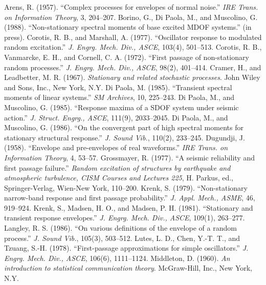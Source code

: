 \documentclass[12pt]{article}
\begin{document}
\begin{thebibliography}{99}
 Arens, R. (1957). ``Complex processes for envelopes of normal noise.'' \emph{IRE Trans. on Information Theory}, 3, 204--207.
 Borino, G., Di Paola, M., and Muscolino, G. (1988). ``Non-stationary spectral moments of base excited MDOF systems.'' (in press).
 Corotis, R. B., and Marshall, A. (1977). ``Oscillator response to modulated random excitation.'' \emph{J. Engrg. Mech. Div., ASCE}, 103(4), 501--513.
 Corotis, R. B., Vanmarcke, E. H., and Cornell, C. A. (1972). ``First passage of non-stationary random processes.'' \emph{J. Engrg. Mech. Div., ASCE}, 98(2), 401--414.
 Cramer, H., and Leadbetter, M. R. (1967). \emph{Stationary and related stochastic processes}. John Wiley and Sons, Inc., New York, N.Y.
 Di Paola, M. (1985). ``Transient spectral moments of linear systems.'' \emph{SM Archives}, 10, 225--243.
 Di Paola, M., and Muscolino, G. (1985). ``Response maxima of a SDOF system under seismic action.'' \emph{J. Struct. Engrg., ASCE}, 111(9), 2033--2045.
 Di Paola, M., and Muscolino, G. (1986). ``On the convergent part of high spectral moments for stationary structural response.'' \emph{J. Sound Vib.}, 110(2), 233--245.
 Dugundji, J. (1958). ``Envelope and pre-envelopes of real waveforms.'' \emph{IRE Trans. on Information Theory}, 4, 53--57.
 Grossmayer, R. (1977). ``A seismic reliability and first passage failure.'' \emph{Random excitation of structures by earthquake and atmospheric turbulence, CISM Courses and Lectures 225}, H. Parkus, ed., Springer-Verlag, Wien-New York, 110--200.
 Krenk, S. (1979). ``Non-stationary narrow-band response and first passage probability.'' \emph{J. Appl. Mech., ASME}, 46, 919--924.
 Krenk, S., Madsen, H. O., and Madsen, P. H. (1981). ``Stationary and transient response envelopes.'' \emph{J. Engrg. Mech. Div., ASCE}, 109(1), 263--277.
 Langley, R. S. (1986). ``On various definitions of the envelope of a random process.'' \emph{J. Sound Vib.}, 105(3), 503--512.
 Lutes, L. D., Chen, Y.-T. T., and Tzuang, S.-H. (1978). ``First-passage approximations for simple oscillators.'' \emph{J. Engrg. Mech. Div., ASCE}, 106(6), 1111--1124.
 Middleton, D. (1960). \emph{An introduction to statistical communication theory}. McGraw-Hill, Inc., New York, N.Y.

\end{thebibliography}
\end{document}

